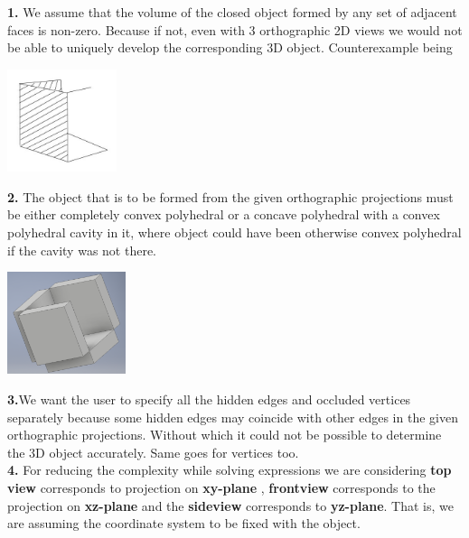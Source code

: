 \indent \textbf{1.} We assume that the volume of the closed object formed by any set of adjacent faces is non-zero. Because if not, even with 3 orthographic 2D views we would not be able to uniquely develop the corresponding 3D object. Counterexample being
\begin{center}
\includegraphics[height = 3cm]{fiz1.png}
\end{center}
\indent \textbf{2.} The object that is to be formed from the given orthographic projections must be either completely convex polyhedral or a concave polyhedral with a convex polyhedral cavity in it, where object could have been otherwise convex polyhedral if the cavity was not there.  \\
\begin{center}
\includegraphics[height = 3cm]{figy.png}
\end{center}
\indent\textbf{3.}We want the user to specify all the hidden edges and occluded vertices separately because some hidden edges may coincide with other edges in the given orthographic projections. Without which it could not be possible to determine the 3D object accurately. Same goes for vertices too. \\
\indent \textbf{4.} For reducing the complexity while solving expressions we are considering \textbf{top view} corresponds to projection on \textbf{xy-plane} , \textbf{frontview} corresponds to the projection on \textbf{xz-plane} and the \textbf{sideview} corresponds to \textbf{yz-plane}. That is, we are assuming the coordinate system to be fixed with the object.\\
